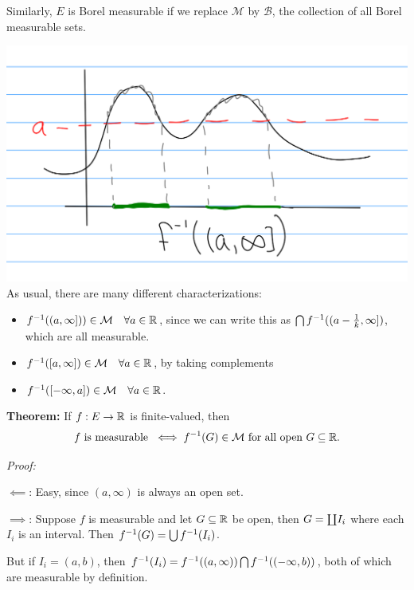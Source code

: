 Similarly, \(E\) is Borel measurable if we replace \(\mathcal M\) by
\(\mathcal B\), the collection of all Borel measurable sets.

\includegraphics{figures/2019-09-10-11:11.png}\\

As usual, there are many different characterizations:

\begin{itemize}
\tightlist
\item
  \(f^{-1}((a, \infty])) \in \mathcal M \quad\forall a\in {\mathbb{R}}\), since we
  can write this as \(\bigcap f^{-1}((a - \frac 1 k, \infty])\), which
  are all measurable.
\item
  \(f^{-1}([a, \infty]) \in \mathcal M \quad\forall a\in {\mathbb{R}}\), by taking
  complements
\item
  \(f^{-1}([-\infty, a]) \in \mathcal M \quad\forall a\in {\mathbb{R}}\).
\end{itemize}

\textbf{Theorem:} If \(f: E\to {\mathbb{R}}\) is finite-valued, then
\begin{align*}
f \text{ is measurable } 
\iff 
f^{-1}(G) \in \mathcal M \text{ for all open } G\subseteq {\mathbb{R}}
.\end{align*}

\emph{Proof:}

\(\impliedby\): Easy, since \((a, \infty)\) is always an open set.

\(\implies\): Suppose \(f\) is measurable and let \(G\subseteq {\mathbb{R}}\) be
open, then \(G = {\coprod} I_i\) where each \(I_i\) is an interval. Then
\(f^{-1}(G) = \bigcup f^{-1}(I_i)\).

But if \(I_i = (a, b)\), then
\(f^{-1}(I_i)= f^{-1}((a, \infty)) \bigcap f^{-1}((-\infty, b))\), both
of which are measurable by definition.

